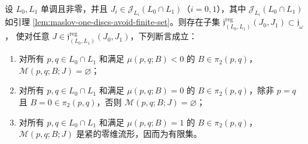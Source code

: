 \begin{theorem}
\label{thm:low-index-monotone-floer-moduli}
设 $L_0,L_1$ 单调且\termMinimalMaslovNumber{}非零，并且
$J_i\in\mathcal J_{L_i}(L_0\cap L_1)$（$i=0,1$），其中
$\mathcal J_{L_i}(L_0\cap L_1)$ 如引理
\ref{lem:maslov-one-discs-avoid-finite-set}。则存在子集
$\mathfrak j^{\mathrm{reg}}_{(L_0,L_1)}(J_0,J_1)\subset\mathfrak j_\omega$，
使对任意 $J\in\mathfrak j^{\mathrm{reg}}_{(L_0,L_1)}(J_0,J_1)$，下列断言成立：
\begin{enumerate}[label=(\arabic*)]
\item 对所有 $p,q\in L_0\cap L_1$ 和满足 $\mu(p,q;B)<0$ 的
$B\in\pi_2(p,q)$，$\mathcal M(p,q;B;J)=\varnothing$；
\item 对所有 $p,q\in L_0\cap L_1$ 和满足 $\mu(p,q;B)=0$ 的
$B\in\pi_2(p,q)$，除非 $p=q$ 且 $B=0\in\pi_2(p,q)$，否则
$\mathcal M(p,q;B;J)=\varnothing$；
\item 对所有 $p,q\in L_0\cap L_1$ 和满足 $\mu(p,q;B)=1$ 的
$B\in\pi_2(p,q)$，$\mathcal M(p,q;B;J)$ 是紧的零维流形，因而为有限集。
\end{enumerate}
\end{theorem}

